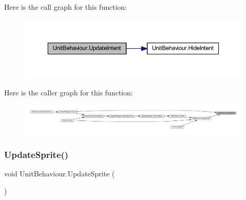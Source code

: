 Here is the call graph for this function\+:
\nopagebreak
\begin{figure}[H]
\begin{center}
\leavevmode
\includegraphics[width=350pt]{class_unit_behaviour_a38efbe995d8d2f3c522cb2fa076e79cc_cgraph}
\end{center}
\end{figure}
Here is the caller graph for this function\+:
\nopagebreak
\begin{figure}[H]
\begin{center}
\leavevmode
\includegraphics[width=350pt]{class_unit_behaviour_a38efbe995d8d2f3c522cb2fa076e79cc_icgraph}
\end{center}
\end{figure}
\mbox{\label{class_unit_behaviour_a559fdec9ef2c1c1a6c1a863cb868bce5}} 
\subsubsection{\texorpdfstring{UpdateSprite()}{UpdateSprite()}}
{\footnotesize\ttfamily void Unit\+Behaviour.\+Update\+Sprite (\begin{DoxyParamCaption}{ }\end{DoxyParamCaption})}

